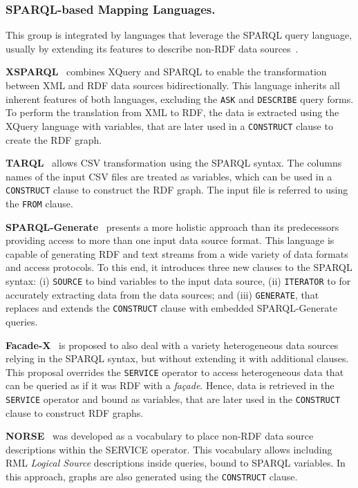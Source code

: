 \subsubsection{SPARQL-based Mapping Languages.}
\label{sec:chp2_SPARQL-languages} 

This group is integrated by languages that leverage the SPARQL query language, usually by extending its features to describe non-RDF data sources~\parencite{harris2013sparql}. 


\noindent\textbf{XSPARQL}~\parencite{Bischof2012xsparql} combines XQuery and SPARQL to enable the transformation between XML and RDF data sources bidirectionally. This language inherits all inherent features of both languages, excluding the \texttt{ASK} and \texttt{DESCRIBE} query forms. To perform the translation from XML to RDF, the data is extracted using the XQuery language with variables, that are later used in a \texttt{CONSTRUCT} clause to create the RDF graph. 

\noindent\textbf{TARQL}~\parencite{tarql} allows CSV transformation using the SPARQL syntax. The columns names of the input CSV files are treated as variables, which can be used in a \texttt{CONSTRUCT} clause to construct the RDF graph. The input file is referred to using the \texttt{FROM} clause. 

\noindent\textbf{SPARQL-Generate}~\parencite{Lefrancois2017sparqlgenerate} presents a more holistic approach than its predecessors providing access to more than one input data source format. This language is capable of generating RDF and text streams from a wide variety of data formats and access protocols. To this end, it introduces three new clauses to the SPARQL syntax: (i) \texttt{SOURCE} to bind variables to the input data source, (ii) \texttt{ITERATOR} to for accurately extracting data from the data sources; and (iii) \texttt{GENERATE}, that replaces and extends the \texttt{CONSTRUCT} clause with embedded SPARQL-Generate queries. 

\noindent\textbf{Facade-X}~\parencite{daga2021facade} is proposed to also deal with a variety heterogeneous data sources relying in the SPARQL syntax, but without extending it with additional clauses. This proposal overrides the \texttt{SERVICE} operator to access heterogeneous data that can be queried as if it was RDF with a \textit{façade}. Hence, data is retrieved in the \texttt{SERVICE} operator and bound as variables, that are later used in the \texttt{CONSTRUCT} clause to construct RDF graphs. 

\noindent\textbf{NORSE}~\parencite{stadler2023spark} was developed as a vocabulary to place non-RDF data source descriptions within the SERVICE operator. This vocabulary allows including RML \textit{Logical Source} descriptions inside queries, bound to SPARQL variables. In this approach, graphs are also generated using the \texttt{CONSTRUCT} clause. 




